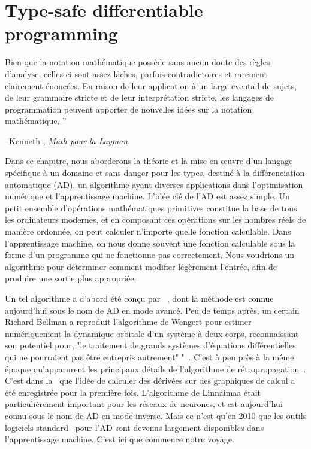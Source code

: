 \chapter{Type-safe differentiable programming}\label{ch:kotlingrad}

\setlength{\epigraphwidth}{0.86\textwidth}
\epigraph{Bien que la notation mathématique possède sans aucun doute des règles d'analyse, celles-ci sont assez lâches, parfois contradictoires et rarement clairement énoncées. En raison de leur application à un large éventail de sujets, de leur grammaire stricte et de leur interprétation stricte, les langages de programmation peuvent apporter de nouvelles idées sur la notation mathématique. ''}{\begin{flushright}--Kenneth \citet{iverson1999math}, \href{https://www.cs.trinity.edu/About/The_Courses/cs301/math-for-the-layman/}{\textit{Math pour la Layman}}\end{flushright}}

Dans ce chapitre, nous aborderons la théorie et la mise en œuvre d'un langage spécifique à un domaine et sans danger pour les types, destiné à la différenciation automatique (AD), un algorithme ayant diverses applications dans l'optimisation numérique et l'apprentissage machine. L'idée clé de l'AD est assez simple. Un petit ensemble d'opérations mathématiques primitives constitue la base de tous les ordinateurs modernes, et en composant ces opérations sur les nombres réels de manière ordonnée, on peut calculer n'importe quelle fonction calculable. Dans l'apprentissage machine, on nous donne souvent une fonction calculable sous la forme d'un programme qui ne fonctionne pas correctement. Nous voudrions un algorithme pour déterminer comment modifier légèrement l'entrée, afin de produire une sortie plus appropriée.

Un tel algorithme a d'abord été conçu par ~\citet{wengert1964simple}, dont la méthode est connue aujourd'hui sous le nom de AD en mode avancé. Peu de temps après, un certain Richard Bellman a reproduit l'algorithme de Wengert pour estimer numériquement la dynamique orbitale d'un système à deux corps, reconnaissant son potentiel pour, "le traitement de grands systèmes d'équations différentielles qui ne pourraient pas être entrepris autrement" "~\citep{bellman1965wengert}. C'est à peu près à la même époque qu'apparurent les principaux détails de l'algorithme de rétropropagation~\citep{dreyfus1990artificiel}. C'est dans la~\citet{linnainmaa1970representation} que l'idée de calculer des dérivées sur des graphiques de calcul a été enregistrée pour la première fois. L'algorithme de Linnaimaa était particulièrement important pour les réseaux de neurones, et est aujourd'hui connu sous le nom de AD en mode inverse. Mais ce n'est qu'en 2010 que les outils logiciels standard~\citep{bergstra2010theano} pour l'AD sont devenus largement disponibles dans l'apprentissage machine. C'est ici que commence notre voyage.

